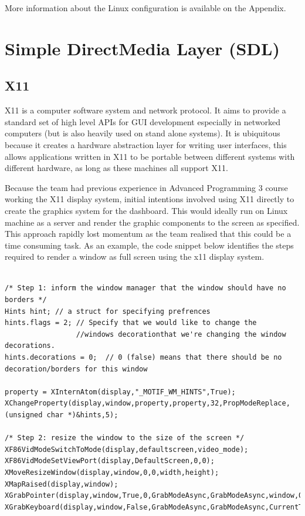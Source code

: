 \documentclass[11pt]{report} %
\begin{document}
	More information about the Linux configuration is available on the Appendix.

	\section{Simple DirectMedia Layer (SDL)}
	
	\subsection {X11}
	X11 is a computer software system and network protocol. It aims to provide a standard set of 
	high level APIs for GUI development
	especially in networked computers (but is also heavily used on stand alone systems). It is ubiquitous because
	it creates a hardware abstraction layer for writing user interfaces, this allows applications written in X11 to be
	portable between different systems with different hardware, as long as these machines all support X11.
	
	Because the team had previous experience in Advanced Programming 3 course working the X11 display system,
	 initial intentions involved using X11 directly to create the  graphics system for the dashboard. 
	This would ideally run on Linux machine as a server 
	and render the graphic components to the screen as specified.\\

	This approach rapidly lost momentum as the team  realised that this could be a time consuming task.
	As an example, 
	the code snippet below identifies the steps required to render a window as full screen using the x11 display system.

\begin{lstlisting}
	
/* Step 1: inform the window manager that the window should have no borders */
Hints hint; // a struct for specifying prefrences
hints.flags = 2; // Specify that we would like to change the 
                 //windows decorationthat we're changing the window decorations.
hints.decorations = 0;  // 0 (false) means that there should be no decoration/borders for this window

property = XInternAtom(display,"_MOTIF_WM_HINTS",True);
XChangeProperty(display,window,property,property,32,PropModeReplace,(unsigned char *)&hints,5);
	
/* Step 2: resize the window to the size of the screen */
XF86VidModeSwitchToMode(display,defaultscreen,video_mode);
XF86VidModeSetViewPort(display,DefaultScreen,0,0);
XMoveResizeWindow(display,window,0,0,width,height);
XMapRaised(display,window);
XGrabPointer(display,window,True,0,GrabModeAsync,GrabModeAsync,window,0L,CurrentTime);
XGrabKeyboard(display,window,False,GrabModeAsync,GrabModeAsync,CurrentTime);
	
\end{lstlisting}
\end{document}
